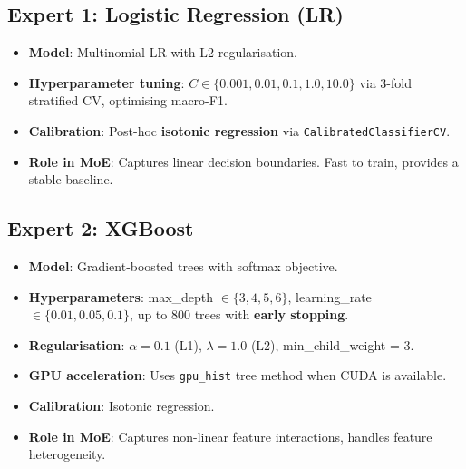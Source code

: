 \documentclass[12pt, a4paper]{article}
\begin{document}
\subsection{Expert 1: Logistic Regression (LR)}
\begin{itemize}
  \item \textbf{Model}: Multinomial LR with L2 regularisation.
  \item \textbf{Hyperparameter tuning}: $C \in \{0.001, 0.01, 0.1, 1.0, 10.0\}$ via 3-fold stratified CV, optimising macro-F1.
  \item \textbf{Calibration}: Post-hoc \textbf{isotonic regression} via \texttt{CalibratedClassifierCV}.
  \item \textbf{Role in MoE}: Captures linear decision boundaries. Fast to train, provides a stable baseline.
\end{itemize}

\subsection{Expert 2: XGBoost}
\begin{itemize}
  \item \textbf{Model}: Gradient-boosted trees with softmax objective.
  \item \textbf{Hyperparameters}: max\_depth $\in \{3,4,5,6\}$, learning\_rate $\in \{0.01, 0.05, 0.1\}$, up to 800 trees with \textbf{early stopping}.
  \item \textbf{Regularisation}: $\alpha = 0.1$ (L1), $\lambda = 1.0$ (L2), min\_child\_weight = 3.
  \item \textbf{GPU acceleration}: Uses \texttt{gpu\_hist} tree method when CUDA is available.
  \item \textbf{Calibration}: Isotonic regression.
  \item \textbf{Role in MoE}: Captures non-linear feature interactions, handles feature heterogeneity.
\end{itemize}
\end{document}
